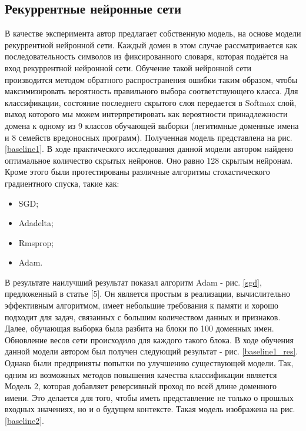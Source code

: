     \subsection{Рекуррентные нейронные сети}\label{lstm_class_exp}
    В качестве эксперимента автор предлагает собственную модель, на основе модели рекуррентной нейронной сети. Каждый домен в этом случае рассматривается как последовательность символов из фиксированного словаря, которая подаётся на вход рекуррентной нейронной сети. Обучение такой нейронной сети производится методом обратного распространения ошибки таким образом, чтобы максимизировать вероятность правильного выбора соответствующего класса. Для классификации, состояние последнего скрытого слоя передается в Softmax слой, выход которого мы можем интерпретировать как вероятности принадлежности домена к одному из 9 классов обучающей выборки (легитимные доменные имена и 8 семейств вредоносных программ). Полученная модель представлена на рис. \ref{baseline1}.
    В ходе практического исследования данной модели автором найдено оптимальное количество скрытых нейронов. Оно равно 128 скрытым нейронам.
    Кроме этого были протестированы различные алгоритмы стохастического градиентного спуска, такие как:
    \begin{itemize}
    \item SGD;
    \item Adadelta;
    \item Rmsprop;
    \item Adam.
    \end{itemize}
    В результате наилучший результат показал алгоритм Adam - рис. \ref{sgd}, предложенный в статье [5]. Он является простым в реализации, вычислительно эффективным алгоритмом, имеет небольшие требования к памяти и хорошо подходит для задач, связанных с большим количеством данных и признаков.
    Далее, обучающая выборка была разбита на блоки по 100 доменных имен. Обновление весов сети происходило для каждого такого блока. В ходе обучения данной модели автором был получен следующий результат - рис. \ref{baseline1_res}.
    Однако были предприняты попытки по улучшению существующей модели. Так, одним из возможных методов повышения качества классификации является Модель 2, которая добавляет реверсивный проход по всей длине доменного имени. Это делается для того, чтобы иметь представление не только о прошлых входных значениях, но и о будущем контексте. Такая модель изображена на рис. \ref{baseline2}.
